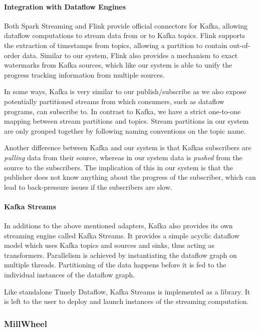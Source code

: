 \paragraph{Integration with Dataflow Engines}

Both Spark Streaming and Flink provide official connectors for Kafka, allowing
dataflow computations to stream data from or to Kafka topics. Flink supports
the extraction of timestamps from topics, allowing a partition
to contain out-of-order data. Similar to our system, Flink also provides a
mechanism to exact watermarks from Kafka sources, which like our system
is able to unify the progress tracking information from multiple sources.

In some ways, Kafka is very similar to our publish/subscribe as we also expose
potentially partitioned streams from which consumers, such as dataflow programs,
can subscribe to. In contrast to Kafka, we have a strict one-to-one mapping between stream
partitions and topics. Stream partitions in our system are only grouped together
by following naming conventions on the topic name. 
 
Another difference between Kafka and our system is that Kafkas subscribers are
\emph{pulling} data from their source, whereas in our system data is \emph{pushed}
from the source to the subscribers. The implication of this in our
system is that the publisher does not know anything about the progress of the
subscriber, which can lead to back-pressure issues if the subscribers are
slow.

\paragraph{Kafka Streams}
In additions to the above mentioned adapters, Kafka also provides its own
streaming engine called Kafka Streams. It provides a simple acyclic dataflow
model which uses Kafka topics and sources and sinks, thus acting as transformers.
Parallelism is achieved by instantiating the dataflow graph on multiple threads.
Partitioning of the data happens before it is fed to the individual instances
of the dataflow graph.

Like standalone Timely Dataflow, Kafka Streams is implemented as a library. It
is left to the user to deploy and launch instances of the streaming computation.

\subsubsection{MillWheel}

